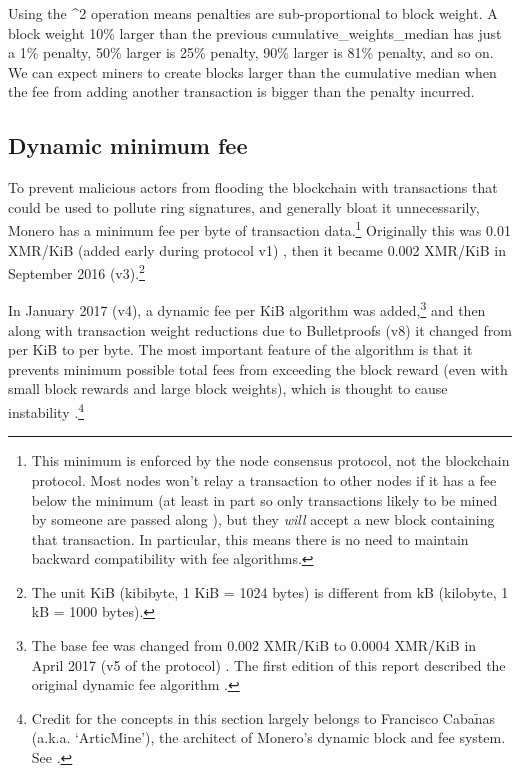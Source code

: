 Using the \^{}2 operation means penalties are sub-proportional to block weight. A block weight 10\% larger than the previous cumulative\_weights\_median has just a 1\% penalty, 50\% larger is 25\% penalty, 90\% larger is 81\% penalty, and so on. \cite{monero-coin-emission}\\

We can expect miners to create blocks larger than the cumulative median when the fee from adding another transaction is bigger than the penalty incurred.


\subsection{Dynamic minimum fee}
\label{subsec:dynamic-minimum-fee} %

To prevent malicious actors from flooding the blockchain with transactions that could be used to pollute ring signatures, and generally bloat it unnecessarily, Monero has a minimum fee per byte of transaction data.\footnote{This minimum is enforced by the node consensus protocol, not the blockchain protocol. Most nodes won't relay a transaction to other nodes if it has a fee below the minimum (at least in part so only transactions likely to be mined by someone are passed along \cite{articmine-36c3-dynamics}), but they {\em will} accept a new block containing that transaction. In particular, this means there is no need to maintain backward compatibility with fee algorithms.} Originally this was 0.01 XMR/KiB (added early during protocol v1) \cite{fee-old-stackexchange}, then it became 0.002 XMR/KiB in September 2016 (v3).\footnote{The unit KiB (kibibyte, 1 KiB = 1024 bytes) is different from kB (kilobyte, 1 kB = 1000 bytes).}%

In January 2017 (v4), a dynamic fee per KiB algorithm \cite{articmine-fee-video, articmine-36c3-dynamics, articmine-defcon27-video, jollymore-old-analysis} was added,\footnote{The base fee was changed from 0.002 XMR/KiB to 0.0004 XMR/KiB in April 2017 (v5 of the protocol) \cite{monero-v5}. The first edition of this report described the original dynamic fee algorithm \cite{ztm-1}.} and then along with transaction weight reductions due to Bulletproofs (v8) it changed from per KiB to per byte. The most important feature of the algorithm is that it prevents minimum possible total fees from exceeding the block reward (even with small block rewards and large block weights), which is thought to cause instability \cite{fee-reward-instability, no-reward-instability, selfish-miner}.\footnote{Credit for the concepts in this section largely belongs to Francisco Caba$\tilde{\textrm{n}}$as (a.k.a. `ArticMine'), the architect of Monero's dynamic block and fee system. See \cite{articmine-fee-video, articmine-36c3-dynamics, articmine-defcon27-video}.}%

